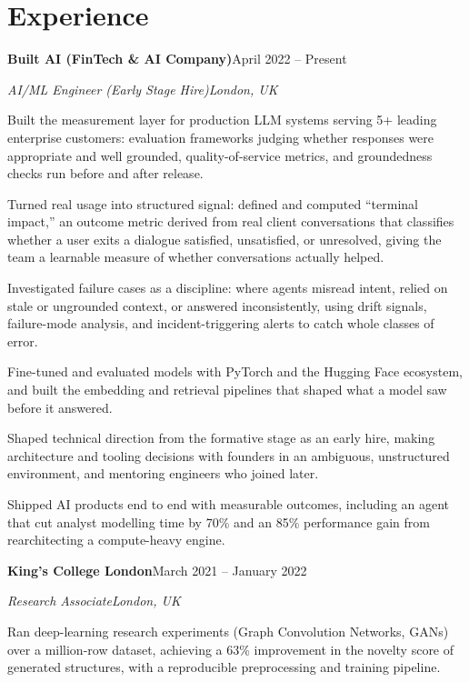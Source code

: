 \documentclass[10pt,a4paper]{article}
\newcommand{\entry}[4]{%
  {\color{company}\bfseries #1}\hfill {\color{muted}#2}\par
  \vspace{1pt}
  {\itshape #3}\hfill {\color{muted}\itshape #4}\par
  \vspace{3pt}%
}
\begin{document}
\section{Experience}
\entry{Built AI (FinTech \& AI Company)}{April 2022 -- Present}{AI/ML Engineer (Early Stage Hire)}{London, UK}
\begin{tight}
  \item Built the measurement layer for production LLM systems serving 5+ leading enterprise customers: evaluation frameworks judging whether responses were appropriate and well grounded, quality-of-service metrics, and groundedness checks run before and after release.
  \item Turned real usage into structured signal: defined and computed ``terminal impact,'' an outcome metric derived from real client conversations that classifies whether a user exits a dialogue satisfied, unsatisfied, or unresolved, giving the team a learnable measure of whether conversations actually helped.
  \item Investigated failure cases as a discipline: where agents misread intent, relied on stale or ungrounded context, or answered inconsistently, using drift signals, failure-mode analysis, and incident-triggering alerts to catch whole classes of error.
  \item Fine-tuned and evaluated models with PyTorch and the Hugging Face ecosystem, and built the embedding and retrieval pipelines that shaped what a model saw before it answered.
  \item Shaped technical direction from the formative stage as an early hire, making architecture and tooling decisions with founders in an ambiguous, unstructured environment, and mentoring engineers who joined later.
  \item Shipped AI products end to end with measurable outcomes, including an agent that cut analyst modelling time by 70\% and an 85\% performance gain from rearchitecting a compute-heavy engine.
\end{tight}

\entry{King's College London}{March 2021 -- January 2022}{Research Associate}{London, UK}
\begin{tight}
  \item Ran deep-learning research experiments (Graph Convolution Networks, GANs) over a million-row dataset, achieving a 63\% improvement in the novelty score of generated structures, with a reproducible preprocessing and training pipeline.
\end{tight}
\end{document}
